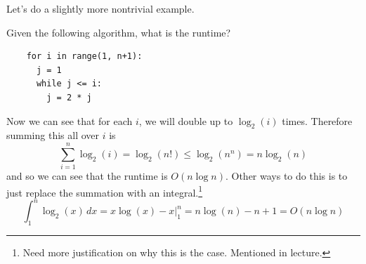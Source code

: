 Let's do a slightly more nontrivial example. 

\begin{example}
  \label{ex:complexity-of-a-recursive-function}
  Given the following algorithm, what is the runtime? 
  \begin{lstlisting}
    for i in range(1, n+1): 
      j = 1 
      while j <= i: 
        j = 2 * j
  \end{lstlisting}
  Now we can see that for each $i$, we will double up to $\log_2 (i)$ times. Therefore summing this all over $i$ is 
  \begin{equation}
    \sum_{i = 1}^n \log_2 (i) = \log_2 (n!) \leq \log_2 (n^n) = n \log_2 (n)
  \end{equation}
  and so we can see that the runtime is $O(n \log n)$. Other ways to do this is to just replace the summation with an integral.\footnote{Need more justification on why this is the case. Mentioned in lecture.} 
  \begin{equation}
    \int_1^n \log_2 (x) \,dx = x \log(x) - x \big|_1^n = n \log(n) - n + 1 = O(n \log n)
  \end{equation}
\end{example}


